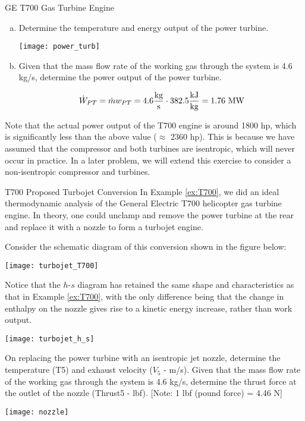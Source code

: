 \begin{example}[label=ex:T700]{GE T700 Gas Turbine Engine}
\begin{enumerate}[a)]
\item Determine the temperature and energy output of the power turbine.
  
  \begin{center}
    \texttt{[image: power\_turb]}
  \end{center}
\item Given that the mass flow rate of the working gas through the system is 4.6 kg/s, determine the power output of the power turbine.

  \begin{equation*}
    \dot{W}_{PT} = \dot{m} w_{PT} = 4.6 \frac{\rm kg}{\rm s} \cdot 382.5\frac{\rm kJ}{\rm kg} = 1.76\ {\rm MW}
  \end{equation*}
  \end{enumerate}

  Note that the actual power output of the T700 engine is around 1800 hp, which is significantly less than the above value ($\approx$ 2360 hp). This is because we have assumed that the compressor and both turbines are isentropic, which will never occur in practice. In a later problem, we will extend this exercise to consider a non-isentropic compressor and turbines.
\end{example}
\newpage
\begin{example}{T700 Proposed Turbojet Conversion}
  In Example \ref{ex:T700}, we did an ideal thermodynamic analysis of the General Electric T700 helicopter gas turbine engine. In theory, one could unclamp and remove the power turbine at the rear and replace it with a nozzle to form a turbojet engine.

Consider the schematic diagram of this conversion shown in the figure below:
  
  \begin{center}
    \texttt{[image: turbojet\_T700]}
  \end{center}

  Notice that the $h$-$s$ diagram has retained the same shape and characteristics as that in Example \ref{ex:T700}, with the only difference being that the change in enthalpy on the nozzle gives rise to a kinetic energy increase, rather than work output.

  \begin{center}
    \texttt{[image: turbojet\_h\_s]}
  \end{center}

  On replacing the power turbine with an isentropic jet nozzle, determine the temperature (T5) and exhaust velocity ($V_5$ - m/s). Given that the mass flow rate of the working gas through the system is 4.6 kg/s, determine the thrust force at the outlet of the nozzle (Thrust5 - lbf). [Note: 1 lbf (pound force) = 4.46 N]

  \begin{center}
    \texttt{[image: nozzle]}
  \end{center}

\end{example}

